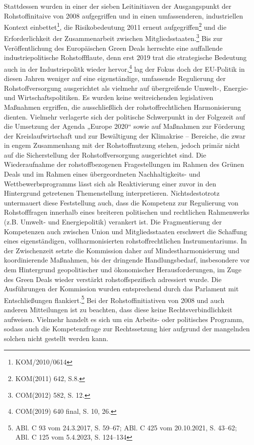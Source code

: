 \documentclass[12pt,a4paper,oneside]{book} %
\begin{document}
Stattdessen wurden in einer der sieben Leitinitiaven der Ausgangspunkt der Rohstoffinitaive von 2008 aufgegriffen und in einen umfassenderen, industriellen Kontext einbettet\footnote{KOM/2010/0614}, die Risikobedeutung 2011 erneut aufgegriffen\footnote{KOM(2011) 642, S.8.} und die Erforderlichkeit der Zusammenarbeit zwischen Mitgliedsstaaten.\footnote{COM(2012) 582, S. 12.} Bis zur Veröffentlichung des Europäischen Green Deals herrschte eine auffallende industriepolitische Rohstoffflaute, denn erst 2019 trat die strategische Bedeutung auch in der Industriepolitk wieder hervor,\footnote{COM(2019) 640 final, S. 10, 26.} lag der Fokus doch der EU-Politik in diesen Jahren weniger auf eine eigenständige, umfassende Regulierung der Rohstoffversorgung ausgerichtet als vielmehr auf übergreifende Umwelt-, Energie- und Wirtschaftspolitiken. Es wurden keine weitreichenden legislativen Maßnahmen ergriffen, die ausschließlich der rohstoffrechtlichen Harmonisierung dienten. Vielmehr verlagerte sich der politische Schwerpunkt in der Folgezeit auf die Umsetzung der Agenda „Europe 2020“ sowie auf Maßnahmen zur Förderung der Kreislaufwirtschaft und zur Bewältigung der Klimakrise – Bereiche, die zwar in engem Zusammenhang mit der Rohstoffnutzung stehen, jedoch primär nicht auf die Sicherstellung der Rohstoffversorgung ausgerichtet sind. Die Wiederaufnahme der rohstoffbezogenen Fragestellungen im Rahmen des Grünen Deals und im Rahmen eines übergeordneten Nachhaltigkeits- und Wettbewerbsprogramms lässt sich als Reaktivierung einer zuvor in den Hintergrund getretenen Themenstellung interpretieren. Nichtsdestotrotz untermauert diese Feststellung auch, dass die Kompetenz zur Regulierung von Rohstofffragen innerhalb eines breiteren politischen und rechtlichen Rahmenwerks (z.B. Umwelt- und Energiepolitik) verankert ist. Die Fragmentierung der Kompetenzen auch zwischen Union und Mitgliedsstaaten erschwert die Schaffung eines eigenständigen, vollharmonisierten rohstoffrechtlichen Instrumentariums. In der Zwischenzeit setzte die Kommission daher auf Mindestharmonisierung und koordinierende Maßnahmen, bis der dringende Handlungsbedarf, insbesondere vor dem Hintergrund geopolitischer und ökonomischer Herausforderungen, im Zuge des Green Deals wieder verstärkt rohstoffspezifisch adressiert wurde.
Die Ausführungen der Kommission wurden entsprechend durch das Parlament mit Entschließungen flankiert.\footnote{ABl. C 93 vom 24.3.2017, S. 59–67; ABl. C 425 vom 20.10.2021, S. 43–62; ABl. C 125 vom 5.4.2023, S. 124–134 }
Bei der Rohstoffinitiativen von 2008 und auch anderen Mitteilungen ist zu beachten, dass diese keine Rechtsverbindlichkeit aufweisen. Vielmehr handelt es sich um ein Arbeits- oder politisches Programm, sodass auch die Kompetenzfrage zur Rechtssetzung hier aufgrund der mangelnden solchen nicht gestellt werden kann.\autocite{Frau_2025, S. 405}
\end{document}
